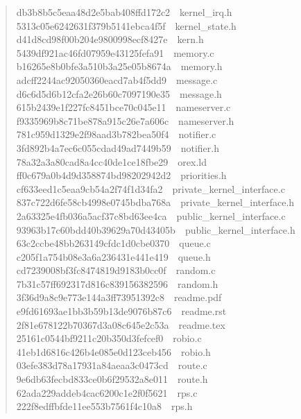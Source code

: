 \documentclass[letterpaper]{article}
\begin{document}
\begin{quote}
{db3b8b5c5eaa48d2e5bab408ffd172c2~~kernel\_irq.h\\
5313c05e6242631f379b5141ebca4f5f~~kernel\_state.h\\
d41d8cd98f00b204e9800998ecf8427e~~kern.h\\
5439df921ac46fd07959e43125fefa91~~memory.c\\
b16265e8b0bfe3a510b3a25e05b8674a~~memory.h\\
adcff2244ac92050360eacd7ab4f5dd9~~message.c\\
d6c6d5d6b12cfa2e26b60c7097190e35~~message.h\\
615b2439e1f227fc8451bce70c045e11~~nameserver.c\\
f9335969b8c71be878a915c26e7a606c~~nameserver.h\\
781c959d1329e2f98aad3b782bea50f4~~notifier.c\\
3fd892b4a7ec6c055cdad49ad7449b59~~notifier.h\\
78a32a3a80cad8a4cc40de1ce18fbe29~~orex.ld\\
ff0c679a0b4d9d358874bd98202942d2~~priorities.h\\
cf633eed1c5eaa9cb54a2f74f1d34fa2~~private\_kernel\_interface.c\\
837c722d6fe58cb4998e0745bdba768a~~private\_kernel\_interface.h\\
2a63325e4fb036a5acf37c8bd63ee4ca~~public\_kernel\_interface.c\\
93963b17c60bdd40b39629a70d43405b~~public\_kernel\_interface.h\\
63c2ccbe48bb263149cfdc1d0cbe0370~~queue.c\\
c205f1a754b08e3a6a236431e441e419~~queue.h\\
cd7239008bf3fc8474819d9183b0cc0f~~random.c\\
7b31c57ff692317d816c839156382596~~random.h\\
3f36d9a8c9e773e144a3ff73951392c8~~readme.pdf\\
e9fd61693ae1bb3b59b13de9076b87c6~~readme.rst\\
2f81e678122b70367d3a08c645e2c53a~~readme.tex\\
25161c0544bf9211c20b350d3fefcef0~~robio.c\\
41eb1d6816c426b4e085e0d123ceb456~~robio.h\\
03efe383d78a17931a84aeaa3c0473cd~~route.c\\
9e6db63fecbd833ce0b6f29532a8e011~~route.h\\
62ada229addeb4cac6200c1e2f0f5621~~rps.c\\
222f8edffbfde11ee553b7561f4c10a8~~rps.h\\
}
\end{quote}
\end{document}
